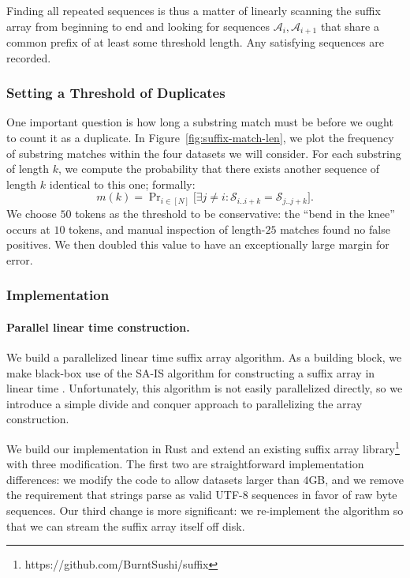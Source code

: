 Finding all repeated sequences is thus a matter of linearly scanning the suffix array from
beginning to end and looking for sequences $\mathcal{A}_i, \mathcal{A}_{i+1}$ that share a common prefix of
at least some threshold length.
%
Any satisfying sequences are recorded.
%

\subsubsection{Setting a Threshold of Duplicates}
\label{section:exact_thresh}
One important question is how long a substring match must be before we ought to count it as a duplicate.
%
In Figure~\ref{fig:suffix-match-len}, we plot the frequency of substring matches within the four datasets we will
consider.
For each substring of length $k$, we compute the probability that there exists another sequence of length $k$ identical to this one; formally:
\[m(k) = \mathop{\text{Pr}}_{i \in [N]}\big[ \exists j \ne i : \mathcal{S}_{i..i+k} = \mathcal{S}_{j..j+k}\big].\]
We choose $50$ tokens as the threshold to be conservative:
the ``bend in the knee'' occurs at $10$ tokens, and manual inspection of
length-$25$ matches found no false positives.
We then doubled this value to have an exceptionally large margin for error.

\subsubsection{Implementation}
\paragraph{Parallel linear time construction.}
We build a parallelized linear time suffix array algorithm.
%
As a building block, we make black-box use of the SA-IS algorithm for
constructing a suffix array in linear time \citet{nong2009linear,ko2003space}.
%
Unfortunately, this algorithm is not easily parallelized directly, so
we introduce a simple divide and conquer approach to parallelizing the array construction.


We build our implementation in Rust and extend an existing suffix array library\footnote{https://github.com/BurntSushi/suffix}
with three modification.
The first two are straightforward implementation differences:
we modify the code to allow datasets larger than $4$GB,
and we remove the requirement that strings parse as valid UTF-8 sequences in favor of raw byte sequences.
Our third change is more significant: we re-implement the algorithm
so that we can stream the suffix array itself off disk.

